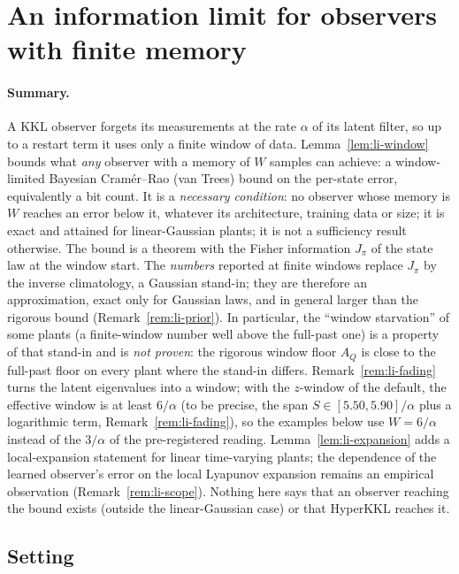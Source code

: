 
\section{An information limit for observers with finite memory}\label{sec:li}

\paragraph{Summary.}  A KKL observer forgets its measurements at the
rate $\alpha$ of its latent filter, so up to a restart term it uses only a finite window of data.
Lemma~\ref{lem:li-window} bounds what \emph{any} observer with a memory of $W$ samples can achieve: a window-limited
Bayesian Cram\'er--Rao (van Trees) bound on the per-state error, equivalently a bit count. It is a
\emph{necessary condition}: no observer whose memory is $W$ reaches an error below it, whatever its architecture,
training data or size; it is exact and attained for linear-Gaussian plants; it is not a sufficiency result otherwise.
The bound is a theorem with the Fisher information $J_\pi$ of the state law at the window start. The \emph{numbers}
reported at finite windows replace $J_\pi$ by the inverse climatology, a Gaussian stand-in; they are therefore an
approximation, exact only for Gaussian laws, and in general larger than the rigorous bound
(Remark~\ref{rem:li-prior}). In particular, the ``window starvation'' of some plants (a finite-window number well above the
full-past one) is a property of that stand-in and is \emph{not proven}: the rigorous window floor $A_Q$ is close to the
full-past floor on every plant where the stand-in differs. Remark~\ref{rem:li-fading} turns the latent eigenvalues into a window;
with the $z$-window of the default, the effective window is at least $6/\alpha$ (to be precise, the span
$S\in[5.50,5.90]/\alpha$ plus a logarithmic term, Remark~\ref{rem:li-fading}), so the examples below use $W=6/\alpha$ instead
of the $3/\alpha$ of the pre-registered reading. Lemma~\ref{lem:li-expansion} adds a local-expansion statement for linear
time-varying plants; the dependence of the learned observer's error on the local Lyapunov expansion remains an
empirical observation (Remark~\ref{rem:li-scope}). Nothing here says that an observer reaching the bound exists
(outside the linear-Gaussian case) or that HyperKKL reaches it.

\subsection{Setting}


